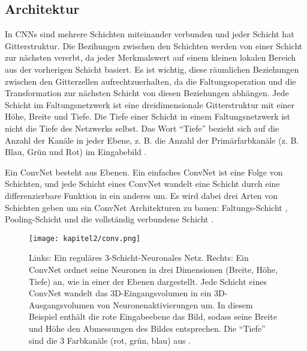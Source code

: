     \subsection{Architektur}
    In CNNs sind mehrere Schichten miteinander verbunden und jeder Schicht hat  Gitterstruktur. Die Bezihungen zwischen den Schichten werden von einer Schicht zur nächsten vererbt, da jeder Merkmalswert auf einem kleinen lokalen Bereich aus der vorherigen Schicht basiert. Es ist wichtig, diese räumlichen Beziehungen zwischen den Gitterzellen aufrechtzuerhalten, da die Faltungsoperation und die Transformation zur nächsten Schicht von diesen Beziehungen abhängen. Jede Schicht im Faltungsnetzwerk ist eine dreidimensionale Gitterstruktur mit einer Höhe, Breite und Tiefe. Die Tiefe einer Schicht in einem Faltungsnetzwerk ist nicht die Tiefe des Netzwerks selbst. Das Wort \enquote{Tiefe} bezieht sich auf die Anzahl der Kanäle in jeder Ebene, z. B. die Anzahl der Primärfarbkanäle (z. B. Blau, Grün und Rot) im Eingabebild \cite*[318]{Aggarwal2018}.

    Ein ConvNet besteht aus Ebenen. Ein einfaches ConvNet ist eine Folge von Schichten, und jede Schicht eines ConvNet wandelt eine Schicht durch eine differenzierbare Funktion in ein anderes um. Es wird dabei drei Arten von Schichten geben um ein ConvNet Architekturen zu bauen: Faltungs-Schicht , Pooling-Schicht und die vollständig verbundene Schicht \cite*{StanfordUniversityCoursecs231n2018a}.

    \begin{figure}[H]
        \centering
        \texttt{[image: kapitel2/conv.png]}
        \caption[Vergleich eines NN mit einem CNN]{Links: Ein reguläres 3-Schicht-Neuronales Netz. Rechts: Ein ConvNet ordnet seine Neuronen in drei Dimensionen (Breite, Höhe, Tiefe) an, wie in einer der Ebenen dargestellt. Jede Schicht eines ConvNet wandelt das 3D-Eingangsvolumen in ein 3D-Ausgangsvolumen von Neuronenaktivierungen um. In diesem Beispiel enthält die rote Eingabeebene das Bild, sodass seine Breite und Höhe den Abmessungen des Bildes entsprechen. Die \enquote{Tiefe} sind die 3 Farbkanäle (rot, grün, blau) aus \cite*{StanfordUniversityCoursecs231n2018a}.}
        \label{Kap2:Conv}
    \end{figure}


